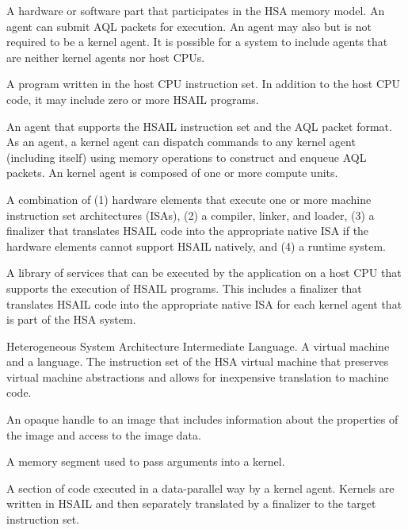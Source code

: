 \documentclass[oneside]{book}
\begin{document}
\begin{description}[itemsep=5pt,leftmargin=0cm, labelindent=0cm]
\item[Agent] A hardware or software part that participates in the HSA
  memory model. An agent can submit AQL packets for execution. An agent
  may also but is not required to be a kernel agent. It is possible for a
  system to include agents that are neither kernel agents nor host CPUs.

\item[HSA application] A program written in the host CPU instruction set. In
  addition to the host CPU code, it may include zero or more HSAIL programs.

\item[kernel agent] An agent that supports the HSAIL instruction set and the
  AQL packet format. As an agent, a kernel agent can dispatch commands to
  any kernel agent (including itself) using memory operations to construct and
  enqueue AQL packets. An kernel agent is composed of one or more compute units.

\item[HSA implementation] A combination of (1) hardware elements that execute
  one or more machine instruction set architectures (ISAs), (2) a compiler,
  linker, and loader, (3) a finalizer that translates HSAIL code into the
  appropriate native ISA if the hardware elements cannot support HSAIL
  natively, and (4) a runtime system.

\item[HSA runtime] A library of services that can be executed by the application
  on a host CPU that supports the execution of HSAIL programs. This includes a
  finalizer that translates HSAIL code into the appropriate native ISA for each
  kernel agent that is part of the HSA system.

\item[HSAIL] Heterogeneous System Architecture Intermediate Language. A virtual
  machine and a language. The instruction set of the HSA virtual machine that
  preserves virtual machine abstractions and allows for inexpensive translation
  to machine code.

\item[Image handle] An opaque handle to an image that includes information about
  the properties of the image and access to the image data.

\item[Kernarg segment] A memory segment used to pass arguments into a kernel.

\item[Kernel] A section of code executed in a data-parallel way by a kernel
  agent. Kernels are written in HSAIL and then separately translated by a
  finalizer to the target instruction set.


\end{description}
\end{document}
